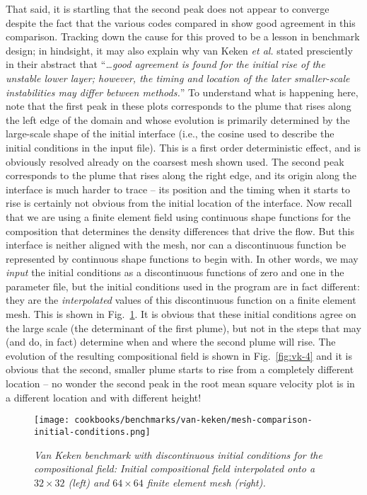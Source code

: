 \documentclass{article}
\begin{document}
That said, it is startling that the second peak does not appear to converge
despite the fact that the various codes compared in \cite{KKSCND97} show good
agreement in this comparison. Tracking down the cause for this proved to be a
lesson in benchmark design; in hindsight, it may also explain why van Keken
\textit{et al.} stated presciently in their abstract that ``\textit{\ldots good
agreement is found for the initial rise of the unstable lower layer; however, the timing
  and location of the later smaller-scale instabilities may differ between
  methods.}''
To understand what is happening here, note that the first peak in these plots
corresponds to the plume that rises along the left edge of the domain and whose
evolution is primarily determined by the large-scale shape of the initial
interface (i.e., the cosine used to describe the initial conditions in the
input file). This is a first order deterministic effect, and is obviously
resolved already on the coarsest mesh shown used. The second peak corresponds to
the plume that rises along the right edge, and its origin along the interface is
much harder to trace -- its position and the timing when it starts to rise is
certainly not obvious from the initial location of the interface. Now recall
that we are using a finite element field using continuous shape functions for
the composition that determines the density differences that drive the flow. But
this interface is neither aligned with the mesh, nor can a discontinuous
function be represented by continuous shape functions to begin with. In other
words, we may \textit{input} the initial conditions as a discontinuous functions
of zero and one in the parameter file, but the initial conditions used in the
program are in fact different: they are the \textit{interpolated} values of this
discontinuous function on a finite element mesh. This is shown in
Fig.~\ref{fig:vk-3}. It is obvious that these initial conditions agree on the
large scale (the determinant of the first plume), but not in the steps that may
(and do, in fact) determine when and where the second plume will rise. The
evolution of the resulting compositional field is shown in Fig.~\ref{fig:vk-4}
and it is obvious that the second, smaller plume starts to rise from a
completely different location -- no wonder the second peak in the root mean
square velocity plot is in a different location and with different height!

\begin{figure}
  \centering
  \texttt{[image: cookbooks/benchmarks/van-keken/mesh-comparison-initial-conditions.png]}
  \caption{\it Van Keken benchmark with discontinuous initial conditions for the
  compositional field:
  Initial compositional field interpolated onto a $32\times 32$ (left) and
  $64\times 64$ finite element mesh (right).}
  \label{fig:vk-3}
\end{figure}
\end{document}
